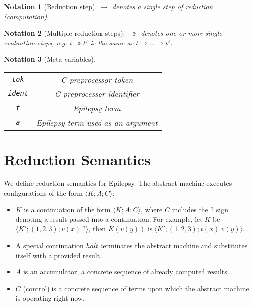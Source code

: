 \documentclass[12pt]{article}
\theoremstyle{break}
\newtheorem{notation}{Notation}
\begin{document}
\begin{notation}[Reduction step]
    $\to$ denotes a single step of reduction (computation).
\end{notation}

\begin{notation}[Multiple reduction steps]
    $\twoheadrightarrow$ denotes one or more single evaluation steps, e.g.
    $\overline{t} \twoheadrightarrow \overline{t'}$ is the same as
    $\overline{t} \to \ldots \to \overline{t'}$.
\end{notation}

\begin{notation}[Meta-variables]
    \ \\
    \begin{tabular}{|c|c|}
        \hline
        \texttt{tok} & C preprocessor token \\
        \texttt{ident} & C preprocessor identifier \\
        \texttt{t} & Epilepsy term \\
        \texttt{a} & Epilepsy term used as an argument \\
        \hline
    \end{tabular}
\end{notation}

\section{Reduction Semantics}

We define reduction semantics for Epilepsy. The abstract machine executes configurations
of the form $\langle K; A; C \rangle$:

\begin{itemize}
    \item $K$ is a continuation of the form $\langle K; A; C \rangle$, where
    $C$ includes the $?$ sign denoting a result passed into a continuation.
    For example, let $K$ be $\langle K'; (1, 2, 3); v(x) \ ? \rangle$,
    then $K(v(y))$ is $\langle K'; (1, 2, 3); v(x) \ v(y) \rangle$.

    \item A special continuation $halt$ terminates the abstract machine and
    substitutes itself with a provided result.

    \item $A$ is an accumulator, a concrete sequence of already computed
    results.

    \item $C$ (control) is a concrete sequence of terms upon which the abstract
    machine is operating right now.
\end{itemize}
\end{document}
